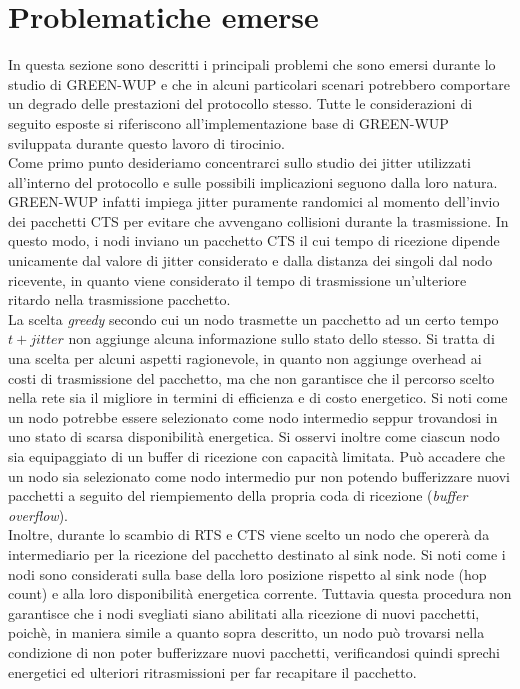 \documentclass[binding=0.6cm,TFA]{sapthesis}
\begin{document}
\let\cleardoublepage\clearpage  %

\newpage
\section{Problematiche emerse}

In questa sezione sono descritti i principali problemi che sono emersi durante lo studio di GREEN-WUP e che in alcuni particolari
scenari potrebbero comportare un degrado delle prestazioni del protocollo stesso. Tutte le considerazioni di seguito esposte si riferiscono
all'implementazione base di GREEN-WUP sviluppata durante questo lavoro di tirocinio.\\

Come primo punto desideriamo concentrarci sullo studio dei jitter utilizzati all'interno del protocollo e sulle possibili implicazioni seguono dalla loro
natura. GREEN-WUP infatti impiega jitter puramente randomici al momento dell'invio dei pacchetti CTS per evitare che avvengano collisioni durante
la trasmissione. In questo modo, i nodi inviano un pacchetto CTS il cui tempo di ricezione dipende unicamente dal valore di jitter
considerato e dalla distanza dei singoli dal nodo ricevente, in quanto viene considerato il tempo di trasmissione un'ulteriore ritardo nella
trasmissione pacchetto.\\

La scelta \emph{greedy} secondo cui un nodo trasmette un pacchetto ad un certo tempo $t+jitter$ non aggiunge alcuna informazione sullo stato dello stesso.
Si tratta di una scelta per alcuni aspetti ragionevole, in quanto non aggiunge overhead ai costi di trasmissione del pacchetto, ma che non garantisce che
il percorso scelto nella rete sia il migliore in termini di efficienza e di costo energetico. Si noti come un nodo potrebbe essere selezionato come nodo
intermedio seppur trovandosi in uno stato di scarsa disponibilità energetica. Si osservi inoltre come ciascun nodo sia equipaggiato di un buffer di ricezione
con capacità limitata. Può accadere che un nodo sia selezionato come nodo intermedio pur non potendo bufferizzare nuovi pacchetti a
seguito del riempiemento della propria coda di ricezione (\emph{buffer overflow}).\\

Inoltre, durante lo scambio di RTS e CTS viene scelto un nodo che opererà da intermediario per la ricezione del pacchetto destinato al sink node. Si noti
come i nodi sono considerati sulla base della loro posizione rispetto al sink node (hop count) e alla loro disponibilità energetica corrente.
Tuttavia questa procedura non garantisce che i nodi svegliati siano abilitati alla ricezione di nuovi pacchetti, poichè, in maniera simile a quanto
sopra descritto, un nodo può trovarsi nella condizione di non poter bufferizzare nuovi pacchetti, verificandosi quindi sprechi energetici ed
ulteriori ritrasmissioni per far recapitare il pacchetto.\\
\end{document}

